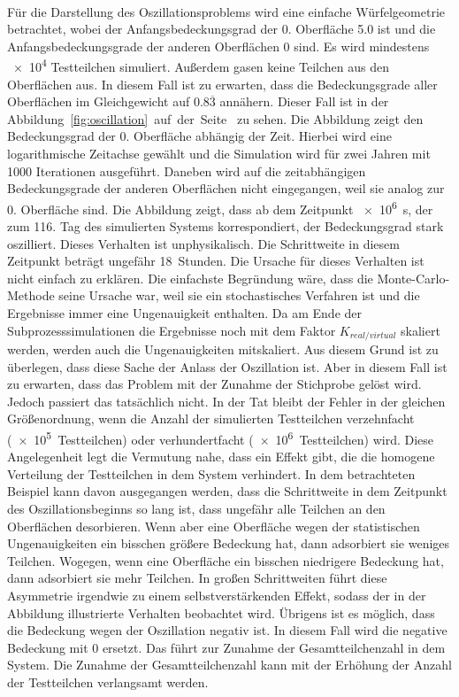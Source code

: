 \documentclass{listhesis}
\begin{document}
\paragraph{}
Für die Darstellung des Oszillationsproblems wird eine einfache Würfelgeometrie betrachtet, wobei der Anfangsbedeckungsgrad der 0. Oberfläche 5.0 ist und die Anfangsbedeckungsgrade der anderen Oberflächen 0 sind. Es wird mindestens \SI{e4}{} Testteilchen simuliert. Außerdem gasen keine Teilchen aus den Oberflächen aus. In diesem Fall ist zu erwarten, dass die Bedeckungsgrade aller Oberflächen im Gleichgewicht auf $0.8\overline{3}$ annähern. Dieser Fall ist in der Abbildung~\ref{fig:oscillation}~auf~der~Seite~\pageref{fig:oscillation} zu sehen. Die Abbildung zeigt den Bedeckungsgrad der 0. Oberfläche abhängig der Zeit. Hierbei wird eine logarithmische Zeitachse gewählt und die Simulation wird für zwei Jahren mit 1000 Iterationen ausgeführt. Daneben wird auf die zeitabhängigen Bedeckungsgrade der anderen Oberflächen nicht eingegangen, weil sie analog zur 0. Oberfläche sind. Die Abbildung zeigt, dass ab dem Zeitpunkt \SI{e6}{\s}, der zum 116. Tag des simulierten Systems korrespondiert, der Bedeckungsgrad stark oszilliert. Dieses Verhalten ist unphysikalisch. Die Schrittweite in diesem Zeitpunkt beträgt ungefähr \SI{18}{Stunden}. Die Ursache für dieses Verhalten ist nicht einfach zu erklären. Die einfachste Begründung wäre, dass die Monte-Carlo-Methode seine Ursache war, weil sie ein stochastisches Verfahren ist und die Ergebnisse immer eine Ungenauigkeit enthalten. Da am Ende der Subprozesssimulationen die Ergebnisse noch mit dem Faktor $K_{real/virtual}$ skaliert werden, werden auch die Ungenauigkeiten mitskaliert. Aus diesem Grund ist zu überlegen, dass diese Sache der Anlass der Oszillation ist. Aber in diesem Fall ist zu erwarten, dass das Problem mit der Zunahme der Stichprobe gelöst wird. Jedoch passiert das tatsächlich nicht. In der Tat bleibt der Fehler in der gleichen Größenordnung, wenn die Anzahl der simulierten Testteilchen verzehnfacht (\SI{e5} {Testteilchen}) oder verhundertfacht (\SI{e6}{Testteilchen}) wird. Diese Angelegenheit legt die Vermutung nahe, dass ein Effekt gibt, die die homogene Verteilung der Testteilchen in dem System verhindert. In dem betrachteten Beispiel kann davon ausgegangen werden, dass die Schrittweite in dem Zeitpunkt des Oszillationsbeginns so lang ist, dass ungefähr alle Teilchen an den Oberflächen desorbieren. Wenn aber eine Oberfläche wegen der statistischen Ungenauigkeiten ein bisschen größere Bedeckung hat, dann adsorbiert sie weniges Teilchen. Wogegen, wenn eine Oberfläche ein bisschen niedrigere Bedeckung hat, dann adsorbiert sie mehr Teilchen. In großen Schrittweiten führt diese Asymmetrie irgendwie zu einem selbstverstärkenden Effekt, sodass der in der Abbildung illustrierte Verhalten beobachtet wird. Übrigens ist es möglich, dass die Bedeckung wegen der Oszillation negativ ist. In diesem Fall wird die negative Bedeckung mit 0 ersetzt. Das führt zur Zunahme der Gesamtteilchenzahl in dem System. Die Zunahme der Gesamtteilchenzahl kann mit der Erhöhung der Anzahl der Testteilchen verlangsamt werden.
\end{document}

